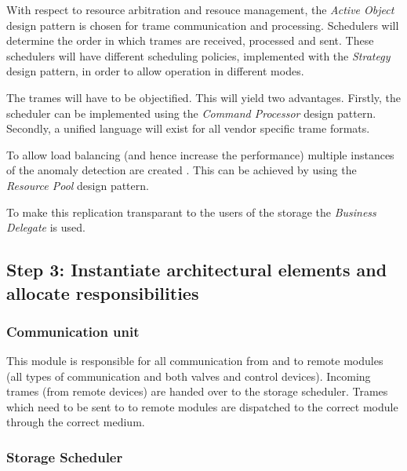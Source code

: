 \npar With respect to resource arbitration and resouce management, the
\emph{Active Object} design pattern is chosen for trame communication and
processing. Schedulers will determine the order in which trames are received,
processed and sent. These schedulers will have different scheduling policies,
implemented with the \emph{Strategy} design pattern, in order to allow operation
in different modes.

\npar The trames will have to be objectified. This will yield two advantages.
Firstly, the scheduler can be implemented using the \emph{Command Processor}
design pattern. Secondly, a unified language will exist for all vendor
specific trame formats.


\npar To allow load balancing (and hence increase the performance) multiple
instances of the anomaly detection are created . This can be achieved by using
the \emph{Resource Pool} design pattern. 

To make this replication transparant to the users of the storage the
\emph{Business Delegate} is used.

\subsection{Step 3: Instantiate architectural elements and allocate responsibilities}
\label{add:it1/elements}


\subsubsection{Communication unit}

\npar This module is responsible for all communication from and to remote
modules (all types of communication and both valves and control devices).
Incoming trames (from remote devices) are handed over to the storage scheduler.
Trames which need to be sent to to remote modules are dispatched to the correct
module through the correct medium.

\subsubsection{Storage Scheduler}

